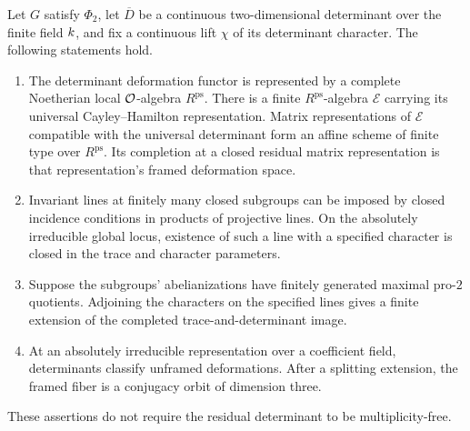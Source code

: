 \begin{proposition}\label{prop:rep-space}
Let $G$ satisfy $\Phi_2$, let $\overline D$ be a continuous
two-dimensional determinant over the finite field $k$, and fix a
continuous lift $\chi$ of its determinant character.  The following
statements hold.
\begin{enumerate}
\item The determinant deformation functor is represented by a complete
Noetherian local $\mathcal O$-algebra $R^{\mathrm{ps}}$.  There is a finite
$R^{\mathrm{ps}}$-algebra $\mathscr E$ carrying its universal Cayley--Hamilton
representation.  Matrix representations of $\mathscr E$ compatible with the
universal determinant form an affine scheme of finite type over
$R^{\mathrm{ps}}$.  Its completion at a closed residual matrix
representation is that representation's framed deformation space.
\item Invariant lines at finitely many closed subgroups can be imposed
by closed incidence conditions in products of projective lines.  On the
absolutely irreducible global locus, existence of such a line with a
specified character is closed in the trace and character parameters.
\item Suppose the subgroups' abelianizations have finitely generated
maximal pro-$2$ quotients.  Adjoining the characters on the specified
lines gives a finite extension of the completed trace-and-determinant
image.
\item At an absolutely irreducible representation over a coefficient
field, determinants classify unframed deformations.  After a splitting
extension, the framed fiber is a conjugacy orbit of dimension three.
\end{enumerate}
These assertions do not require the residual determinant to be
multiplicity-free.
\end{proposition}

